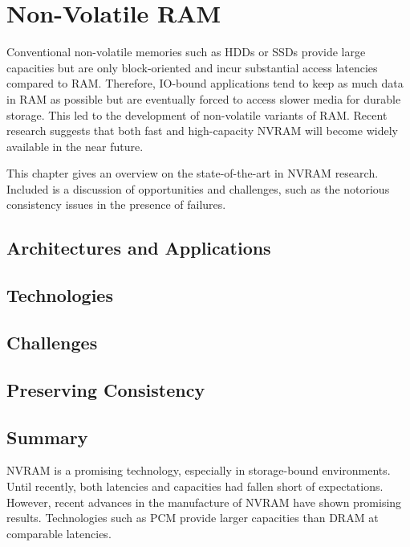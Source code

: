 \chapter{Non-Volatile RAM}
\label{ch:nvram}

Conventional non-volatile memories such as \acp{HDD} or \acp{SSD} provide large
capacities but are only block-oriented and incur substantial access latencies
compared to \ac{RAM}. Therefore, \ac{IO}-bound applications tend to keep as much
data in \ac{RAM} as possible but are eventually forced to access slower media
for durable storage. This led to the development of non-volatile variants of
\ac{RAM}. Recent research suggests that both fast and high-capacity \ac{NVRAM}
will become widely available in the near future.

This chapter gives an overview on the state-of-the-art in \ac{NVRAM} research.
Included is a discussion of opportunities and challenges, such as the notorious
consistency issues in the presence of failures.

\section{Architectures and Applications}
\label{ch:nvram-architectures}


\section{Technologies}
\label{ch:nvram-technologies}


\section{Challenges}
\label{ch:nvram-challenges}


\section{Preserving Consistency}
\label{ch:nvram-consistency}


\section{Summary}
\label{ch:nvram-summary}

\ac{NVRAM} is a promising technology, especially in storage-bound environments.
Until recently, both latencies and capacities had fallen short of expectations.
However, recent advances in the manufacture of \ac{NVRAM} have shown promising
results. Technologies such as \ac{PCM} provide larger capacities than \ac{DRAM}
at comparable latencies.

